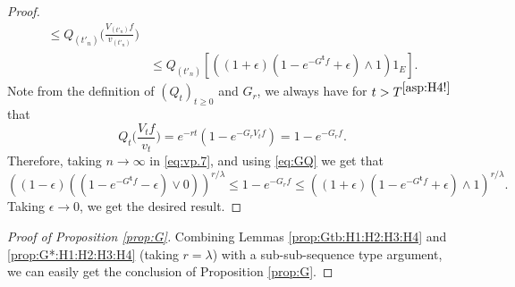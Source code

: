 \documentclass[12pt,a4paper]{amsart}
\numberwithin{equation}{section}
\theoremstyle{plain}
\theoremstyle{definition}
\theoremstyle{remark}
\begin{document}
\begin{proof}
\begin{align}
	\leq Q_{(t'_n)}\Big( \frac{V_{(t'_n)}f}{v_{(t'_n)}} \Big)
	\\&\leq Q_{(t'_n)}\left[ \left((1+\epsilon) ( 1 - e^{- G^{\mathbf t}f} + \epsilon) \wedge 1\right) 1_E \right].
\end{align}
	Note from the definition of $(Q_t)_{t\geq 0}$ and $G_r$, we always have for $t>T^{\eqref{asp:H4!}}$ that
\[
	Q_t \Big( \frac{V_tf}{v_t}  \Big)
	= e^{- r t}( 1 - e^{- G_rV_tf}  )
	= 1- e^{- G_r f}.
\]
	Therefore, taking $n \to \infty$ in \eqref{eq:vp.7}, and using \eqref{eq:GQ}  we get that
\[
	\left((1-\epsilon) \left((1 - e^{- G^{\mathbf t}f} - \epsilon)\vee 0\right) \right)^{r/\lambda}
	\leq 1 - e^{- G_r f}
	 \leq \left((1 + \epsilon) (1 - e^{- G^{\mathbf t} f} + \epsilon)\wedge 1 \right)^{r/\lambda}.
\]
	Taking $\epsilon \to 0$, we get the desired result.
\end{proof}

\begin{proof}[Proof of Proposition \ref{prop:G}]
	Combining  Lemmas \ref{prop:Gtb:H1:H2:H3:H4} and \ref{prop:G*:H1:H2:H3:H4}
	(taking $r=\lambda$)
	with a sub-sub-sequence type argument, we can easily get the conclusion of Proposition \ref{prop:G}.
\end{proof}
\end{document}
